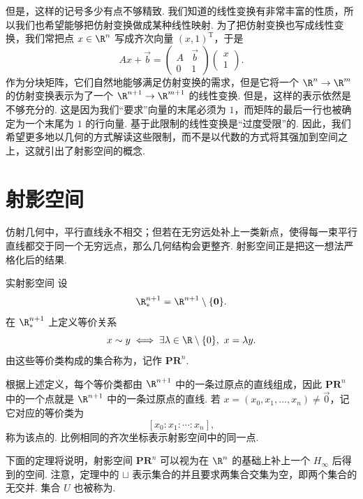 但是，这样的记号多少有点不够精致. 我们知道的线性变换有非常丰富的性质，所以我们也希望能够把仿射变换做成某种线性映射. 为了把仿射变换也写成线性变换，我们常把点 $x \in \R^n$ 写成齐次向量 $(x, 1)^\mathrm{T}$，于是
\[
    A x + \vec{b}
    =
    \begin{pmatrix}
        A & \vec{b} \\
        0 & 1
    \end{pmatrix}
    \begin{pmatrix}
        x \\
        1
    \end{pmatrix}.
\]
作为分块矩阵，它们自然地能够满足仿射变换的需求，但是它将一个 $\R^n \to \R^m$ 的仿射变换表示为了一个 $\R^{n + 1} \to \R^{m + 1}$ 的线性变换. 但是，这样的表示依然是不够充分的. 这是因为我们``要求''向量的末尾必须为 $1$，而矩阵的最后一行也被确定为一个末尾为 $1$ 的行向量. 基于此限制的线性变换是``过度受限''的. 因此，我们希望更多地以几何的方式解读这些限制，而不是以代数的方式将其强加到空间之上，这就引出了射影空间的概念.

\section{射影空间} \label{sec:射影空间}

仿射几何中，平行直线永不相交；但若在无穷远处补上一类新点，使得每一束平行直线都交于同一个无穷远点，那么几何结构会更整齐. 射影空间正是把这一想法严格化后的结果.

\begin{definition}{实射影空间}{}
    设
    \[
        \R^{n + 1}_* = \R^{n + 1} \setminus \{ \vec{0} \}.
    \]
    在 $\R^{n + 1}_*$ 上定义等价关系
    \[
        x \sim y
        \iff
        \exists \lambda \in \R \setminus \{ 0 \},\ x = \lambda y.
    \]
    由这些等价类构成的集合称为，记作 $\mathbf{PR}^n$.
\end{definition}

根据上述定义，每个等价类都由 $\R^{n + 1}$ 中的一条过原点的直线组成，因此 $\mathbf{PR}^n$ 中的一个点就是 $\R^{n + 1}$ 中的一条过原点的直线. 若 $x = (x_0, x_1, \ldots, x_n) \neq \vec{0}$，记它对应的等价类为
\[
    [x_0 : x_1 : \cdots : x_n],
\]
称为该点的. 比例相同的齐次坐标表示射影空间中的同一点.

下面的定理将说明，射影空间 $\mathbf{PR}^n$ 可以视为在 $\R^n$ 的基础上补上一个 $H_\infty$ 后得到的空间. 注意，定理中的 $\sqcup$ 表示集合的并且要求两集合交集为空，即两个集合的无交并. 集合 $U$ 也被称为.

